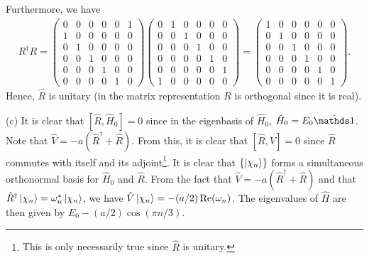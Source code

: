 {Furthermore, we have
\begin{eqnarray}
    R^{\dagger} R = 
   \begin{pmatrix}
        0 & 0 & 0 & 0 & 0 & 1 \\
        1 & 0 & 0 & 0 & 0 & 0 \\
        0 & 1 & 0 & 0 & 0 & 0 \\
        0 & 0 & 1 & 0 & 0 & 0 \\
        0 & 0 & 0 & 1 & 0 & 0 \\
        0 & 0 & 0 & 0 & 1 & 0
    \end{pmatrix}
    \begin{pmatrix}
        0 & 1 & 0 & 0 & 0 & 0 \\
        0 & 0 & 1 & 0 & 0 & 0 \\
        0 & 0 & 0 & 1 & 0 & 0 \\
        0 & 0 & 0 & 0 & 1 & 0 \\
        0 & 0 & 0 & 0 & 0 & 1 \\
        1 & 0 & 0 & 0 & 0 & 0 
    \end{pmatrix}
    = 
    \begin{pmatrix}
        1 & 0 & 0 & 0 & 0 & 0 \\
        0 & 1 & 0 & 0 & 0 & 0 \\
        0 & 0 & 1 & 0 & 0 & 0 \\
        0 & 0 & 0 & 1 & 0 & 0 \\
        0 & 0 & 0 & 0 & 1 & 0 \\
        0 & 0 & 0 & 0 & 0 & 1
    \end{pmatrix}
.\end{eqnarray}
Hence, $\hat{R}$ is unitary (in the matrix representation $R$ is orthogonal since it is real).

(c) It is clear that $[\hat{R},\hat{H}_0] = 0$ since in the eigenbasis of $\hat{H}_{0}$, $\hat{H}_{0} = E_0 \hat{\id}$.
Note that $\hat{V} = -a (\hat{R}^{\dagger} + \hat{R})$.
From this, it is clear that $[\hat{R},V] = 0$ since $\hat{R}$ commutes with itself and its adjoint\footnote{This is only necessarily true since $\hat{R}$ is unitary.}.
It is clear that $\{ \ket{\chi_{n}} \} $ forms a simultaneous orthonormal basis for $\hat{H}_0$ and $\hat{R}$.
From the fact that $\hat{V} = -a( \hat{R}^{\dagger} + \hat{R} )$ and that $\hat{R}^{\dagger} \ket{\chi_{n}} = \omega_{n}^{*} \ket{\chi_{n}}$, we have $\hat{V} \ket{\chi_{n}} = -(a/2) \Re(\omega_{n})$.
The eigenvalues of $\hat{H}$ are then given by $E_0 - (a/2)\cos(\pi n/3)$.

}


